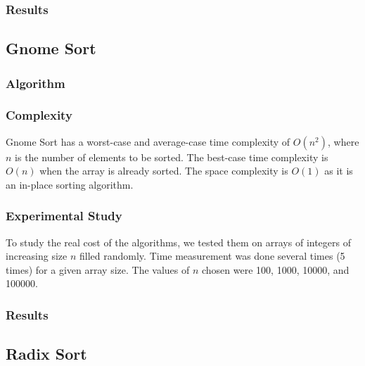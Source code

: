 \documentclass{article}
\begin{document}
\subsubsection{Results}
\begin{figure}[ht]
\end{figure}


\subsection{Gnome Sort}

\subsubsection{Algorithm}

\subsubsection{Complexity}
Gnome Sort has a worst-case and average-case time complexity of $O(n^2)$, where $n$ is the number of elements to be sorted. The best-case time complexity is $O(n)$ when the array is already sorted. The space complexity is $O(1)$ as it is an in-place sorting algorithm.

\subsubsection{Experimental Study}
To study the real cost of the algorithms, we tested them on arrays of integers of increasing size $n$ filled randomly. Time measurement was done several times (5 times) for a given array size. The values of $n$ chosen were 100, 1000, 10000, and 100000.

\subsubsection{Results}
\begin{figure}[ht]
\end{figure}


\subsection{Radix Sort}
\end{document}
